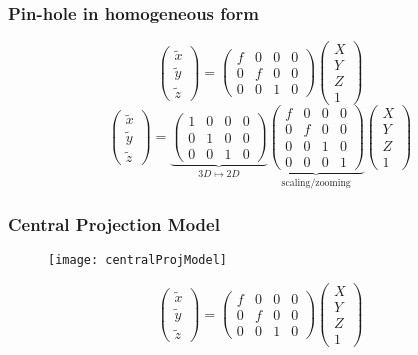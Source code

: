 \begin{frame}
\frametitle{Pin-hole in homogeneous form}
\[
\left (
\begin{array}{c}
\tilde{x}\\
\tilde{y}\\
\tilde{z}
\end{array}
\right )
=
\left (
\begin{array}{cccc}
f & 0 & 0 & 0 \\
0 & f & 0 & 0 \\
0 & 0 & 1 & 0
\end{array}
\right )
\left (
\begin{array}{c}
X \\
Y \\
Z \\
1
\end{array}
\right )
\]
%
\[
\left (
\begin{array}{c}
\tilde{x}\\
\tilde{y}\\
\tilde{z}
\end{array}
\right )
=
\underbrace{
\left (
\begin{array}{cccc}
1 & 0 & 0 & 0 \\
0 & 1 & 0 & 0 \\
0 & 0 & 1 & 0
\end{array}
\right )
}_{3D \mapsto 2D}
\underbrace{
\left (
\begin{array}{cccc}
f & 0 & 0 & 0 \\
0 & f & 0 & 0 \\
0 & 0 & 1 & 0 \\
0 & 0 & 0 & 1
\end{array}
\right )
}_{\text{scaling/zooming}}
\left (
\begin{array}{c}
X \\
Y \\
Z \\
1
\end{array}
\right )
\]
\end{frame}

\begin{frame}
\frametitle{Central Projection Model}
\begin{figure}[!h]
\centering
\texttt{[image: centralProjModel]}
\end{figure}
\[
\left (
\begin{array}{c}
\tilde{x}\\
\tilde{y}\\
\tilde{z}
\end{array}
\right )
=
\left (
\begin{array}{cccc}
f & 0 & 0 & 0 \\
0 & f & 0 & 0 \\
0 & 0 & 1 & 0
\end{array}
\right )
\left (
\begin{array}{c}
X \\
Y \\
Z \\
1
\end{array}
\right )
\]
\end{frame}

